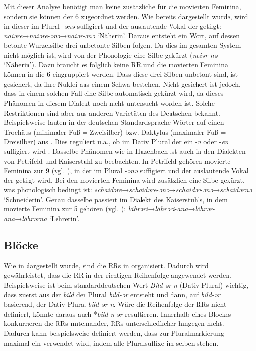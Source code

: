 Mit dieser Analyse benötigt man keine zusätzliche  für die movierten Feminina, sondern sie können der  6 zugeordnet werden. Wie bereits dargestellt wurde, wird in dieser  im Plural -\textit{ənə} suffigiert und der auslautende Vokal der  getilgt: \textit{naiəre}→\textit{naiəre}-\textit{ənə}→\textit{naiər}-\textit{ənə} ‘Näherin’. Daraus entsteht ein Wort, auf dessen betonte Wurzelsilbe drei unbetonte Silben folgen. Da dies im gesamten System nicht möglich ist, wird von der Phonologie eine Silbe gekürzt (\textit{naiər}-\textit{nə} ‘Näherin’). Dazu braucht es folglich keine RR und die movierten Feminina können in die  6 eingruppiert werden. Dass diese drei Silben unbetont sind, ist gesichert, da ihre Nuklei aus einem Schwa bestehen. Nicht gesichert ist jedoch, dass in einem solchen Fall eine Silbe automatisch gekürzt wird, da dieses Phänomen in diesem Dialekt noch nicht untersucht worden ist. Solche Restriktionen sind aber aus anderen Varietäten des Deutschen bekannt. Beispielsweise lauten in der deutschen Standardsprache Wörter auf einen Trochäus (minimaler Fuß = Zweisilber) bzw. Daktylus (maximaler Fuß = Dreisilber) aus \citep[130, 135]{Eisenberg2006}. Dies reguliert u.a., ob im Dativ Plural der  ein -\textit{n} oder -\textit{en} suffigiert wird \citep[167-169]{Eisenberg2006}. Dasselbe Phänomen wie in Huzenbach ist auch in den Dialekten von Petrifeld und Kaiserstuhl zu beobachten. In Petrifeld gehören movierte Feminina zur  9 (vgl. ), in der im Plural -\textit{ənə} suffigiert und der auslautende Vokal der  getilgt wird. Bei den movierten Feminina wird zusätzlich eine Silbe gekürzt, was phonologisch bedingt ist: \textit{schaidəre}→\textit{schaidəre}-\textit{ənə}→\textit{schaidər}-\textit{ənə}→\textit{schaidərnə} ‘Schneiderin’. Genau dasselbe passiert im Dialekt des Kaiserstuhls, in dem movierte Feminina zur  5 gehören (vgl. ): \textit{lährəri}→\textit{lährəri}-\textit{ana}→\textit{lährər}-\textit{ana}→\textit{lährərna} ‘Lehrerin’.

\subsection{Blöcke}\label{5.1.5}

Wie in  dargestellt wurde, sind die RRs in  organisiert. Dadurch wird gewährleistet, dass die RR in der richtigen Reihenfolge angewendet werden. Beispielsweise ist beim standarddeutschen Wort \textit{Bild-ər-n} (Dativ Plural) wichtig, dass zuerst aus der  \textit{bild} der Plural \textit{bild-ər} entsteht und dann, auf \textit{bild-ər} basierend, der Dativ Plural \textit{bild-ər-n}. Wäre die Reihenfolge der RRs nicht definiert, könnte daraus auch *\textit{bild-n-ər} resultieren. Innerhalb eines Blockes konkurrieren die RRs miteinander, RRs unterschiedlicher  hingegen nicht. Dadurch kann beispielsweise definiert werden, dass zur Pluralmarkierung maximal ein  verwendet wird, indem alle Pluralsuffixe im selben  stehen.

